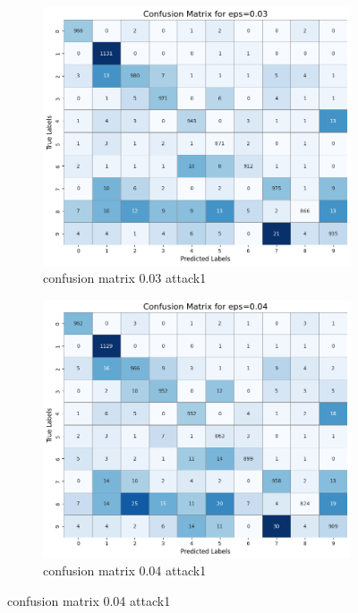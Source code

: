 \documentclass[11pt,onside]{article}
\begin{document}
\begin{figure}[h]
  \centering
  \begin{subfigure}[b]{0.49\textwidth}
    \centering
    \includegraphics[width=\textwidth]{V2_images/confusion_matrix_eps_0.03_attack_1.png}
    \caption{confusion matrix 0.03 attack1}
    \label{fig:image1}
  \end{subfigure}
  \hfill
  \begin{subfigure}[b]{0.49\textwidth}
    \centering
    \includegraphics[width=\textwidth]{V2_images/confusion_matrix_eps_0.04_attack_1.png}
    \caption{confusion matrix 0.04 attack1}
    \label{fig:image2}
  \end{subfigure}
  \label{fig:images}
\end{figure}
\end{document}
